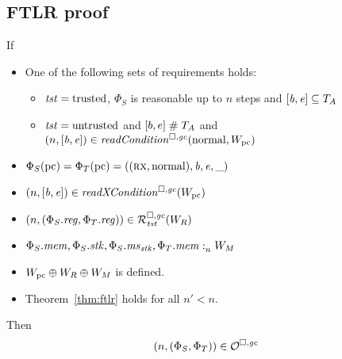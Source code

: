 \subsection{FTLR proof}

\begin{lemma}
  \label{lem:ftlr-internal-lemma}
  If
  \begin{itemize}
  \item One of the following sets of requirements holds:
    \begin{itemize}
    \item $\mathit{tst} = \mathrm{trusted}$, $\Phi_S$ is reasonable up to $n$ steps and $[\mathit{b},\mathit{e}] \subseteq T_{A}$
    \item $\mathit{tst} = \mathrm{untrusted}$ and $[b,e] \mathrel{\#} T_{A}$ and $\npair{[\baddr,\eaddr]} \in \readCond{\normal,W_\pcreg}$
    \end{itemize}
  \item $\Phi_S(\mathrm{pc}) = \Phi_T(\mathrm{pc}) = ((\textsc{rx},\mathrm{normal}),\mathit{b},\mathit{e},\_)$
  \item $\npair{[\baddr,\eaddr]} \in \xReadCond{W_\pcreg}$
  \item $\npair{(\Phi_S.\reg,\Phi_T.\reg)} \in \lrrg{\trust}(W_R)$
  \item $\Phi_S.\mathit{mem},\Phi_S.\mathit{stk},\Phi_S.\mathit{ms}_{\mathit{stk}},\Phi_T.\mathit{mem} :_{n}^{}W_M$
  \item $W_{\mathrm{pc}} \oplus W_R \oplus W_M$ is defined.
  \item Theorem~\ref{thm:ftlr} holds for all $n' < n$.
  \end{itemize}
  Then
  \[
    \left(n,(\Phi_S,\Phi_T)\right) \in \mathcal{O}^{\square,\mathit{gc}}
  \]
\end{lemma}
